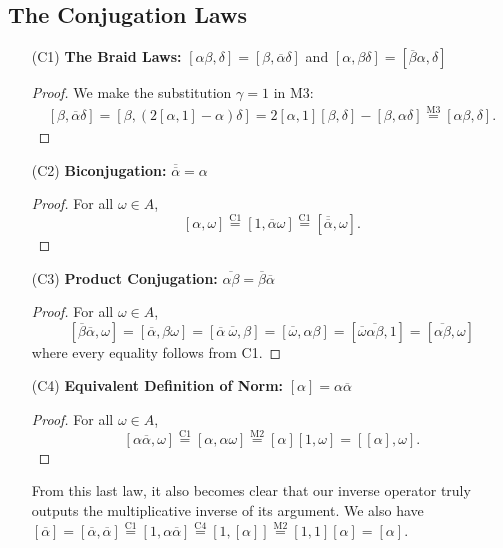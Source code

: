 \documentclass[10pt]{amsart}
\renewcommand{\bar}{\overline}
\newcommand{\norm}[1]{\left[#1\right]}
\begin{document}
\subsection{The Conjugation Laws}
\begin{enumerate}
\item[(C1)] \textbf{The Braid Laws:}
$
\norm{\alpha \beta, \delta} = \norm{\beta, \bar{\alpha}\delta}$ and $\norm{ \alpha, \beta \delta} = \norm{\bar{\beta} \alpha , \delta }
$

\begin{proof}
We make the substitution $\gamma = 1$ in M3:
\begin{align*}
\norm{\beta, \bar{\alpha}\delta}
=
\norm{\beta, (2\norm{\alpha,1} - \alpha)\delta}
=
2\norm{\alpha,1}\norm{\beta,\delta} - \norm{\beta,\alpha\delta}
\overset{\text{M}3}{=} \norm{\alpha\beta,\delta}.
\end{align*}
\end{proof}

\item[(C2)] \textbf{Biconjugation:}
$
\bar{\bar{\alpha}} = \alpha
$

\begin{proof}
For all $\omega \in A$,
$$
\norm{\alpha, \omega} \overset{\text{C}1}{=} \norm{1, \bar{\alpha}\omega} \overset{\text{C}1}{=} \norm{\bar{\bar{\alpha}},\omega}.
$$
\end{proof}

\item[(C3)] \textbf{Product Conjugation:}
$\bar{\alpha \beta} = \bar{\beta}\bar{\alpha}$

\begin{proof}
For all $\omega \in A$,
$$
\norm{\bar{\beta}\bar{\alpha},\omega} = \norm{\bar{\alpha},\beta\omega} = \norm{\bar{\alpha} \ \bar{\omega},\beta} = \norm{\bar{\omega},\alpha \beta} = \norm{\bar{\omega}\bar{\alpha \beta},1} = \norm{\bar{\alpha\beta},\omega}
$$
where every equality follows from C1.
\end{proof}

\item[(C4)] \textbf{Equivalent Definition of Norm:}
$\norm{\alpha} = \alpha \bar{\alpha}$

\begin{proof}
For all $\omega \in A$,
$$
\norm{\alpha \bar{\alpha},\omega} \overset{\text{C}1}{=} \norm{\alpha, \alpha \omega} \overset{\text{M}2}{=} \norm{\alpha}\norm{1, \omega} = \norm{\norm{\alpha},\omega}.
$$
\end{proof}
\noindent
From this last law, it also becomes clear that our inverse operator truly outputs the multiplicative inverse of its argument.  We also have $\norm{\bar{\alpha}} = \norm{\bar{\alpha},\bar{\alpha}} \overset{\text{C}1}{=} \norm{1,\alpha\bar{\alpha}} \overset{\text{C}4}{=} \norm{1,\norm{\alpha}} \overset{\text{M}2}{=} \norm{1,1} \norm{\alpha} = \norm{\alpha}$.
\end{enumerate}
\end{document}
